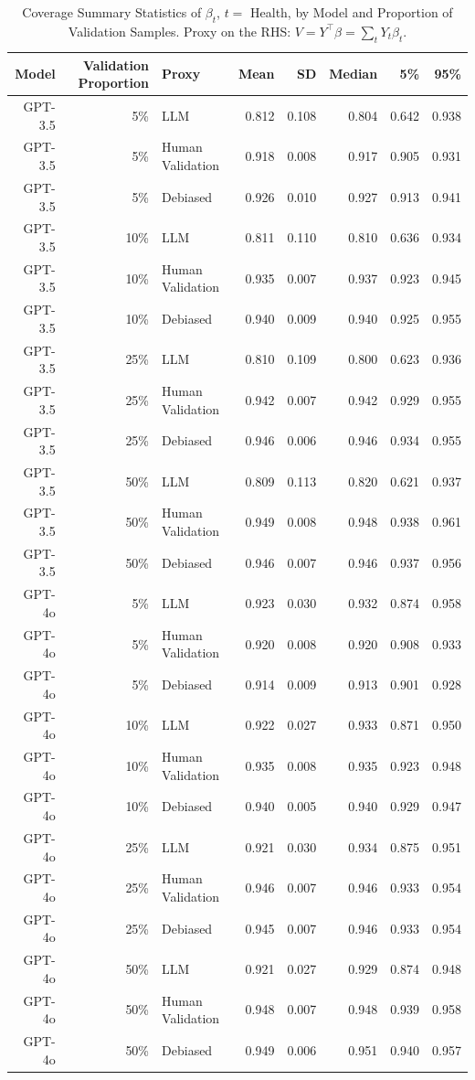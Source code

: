 \begin{table}

\caption{Coverage Summary Statistics of $\beta_{t}$, $t=$ Health, by Model and Proportion of Validation Samples.
      Proxy on the RHS: $V = Y^\top \beta = \sum_{t} Y_t \beta_t$.}
\centering
\begin{tabular}[t]{rrlrrrrr}
\toprule
Model & Validation Proportion & Proxy & Mean & SD & Median & 5\% & 95\%\\
\midrule
GPT-3.5 & 5\% & LLM & 0.812 & 0.108 & 0.804 & 0.642 & 0.938\\
GPT-3.5 & 5\% & Human Validation & 0.918 & 0.008 & 0.917 & 0.905 & 0.931\\
GPT-3.5 & 5\% & Debiased & 0.926 & 0.010 & 0.927 & 0.913 & 0.941\\
GPT-3.5 & 10\% & LLM & 0.811 & 0.110 & 0.810 & 0.636 & 0.934\\
GPT-3.5 & 10\% & Human Validation & 0.935 & 0.007 & 0.937 & 0.923 & 0.945\\
GPT-3.5 & 10\% & Debiased & 0.940 & 0.009 & 0.940 & 0.925 & 0.955\\
GPT-3.5 & 25\% & LLM & 0.810 & 0.109 & 0.800 & 0.623 & 0.936\\
GPT-3.5 & 25\% & Human Validation & 0.942 & 0.007 & 0.942 & 0.929 & 0.955\\
GPT-3.5 & 25\% & Debiased & 0.946 & 0.006 & 0.946 & 0.934 & 0.955\\
GPT-3.5 & 50\% & LLM & 0.809 & 0.113 & 0.820 & 0.621 & 0.937\\
GPT-3.5 & 50\% & Human Validation & 0.949 & 0.008 & 0.948 & 0.938 & 0.961\\
GPT-3.5 & 50\% & Debiased & 0.946 & 0.007 & 0.946 & 0.937 & 0.956\\
GPT-4o & 5\% & LLM & 0.923 & 0.030 & 0.932 & 0.874 & 0.958\\
GPT-4o & 5\% & Human Validation & 0.920 & 0.008 & 0.920 & 0.908 & 0.933\\
GPT-4o & 5\% & Debiased & 0.914 & 0.009 & 0.913 & 0.901 & 0.928\\
GPT-4o & 10\% & LLM & 0.922 & 0.027 & 0.933 & 0.871 & 0.950\\
GPT-4o & 10\% & Human Validation & 0.935 & 0.008 & 0.935 & 0.923 & 0.948\\
GPT-4o & 10\% & Debiased & 0.940 & 0.005 & 0.940 & 0.929 & 0.947\\
GPT-4o & 25\% & LLM & 0.921 & 0.030 & 0.934 & 0.875 & 0.951\\
GPT-4o & 25\% & Human Validation & 0.946 & 0.007 & 0.946 & 0.933 & 0.954\\
GPT-4o & 25\% & Debiased & 0.945 & 0.007 & 0.946 & 0.933 & 0.954\\
GPT-4o & 50\% & LLM & 0.921 & 0.027 & 0.929 & 0.874 & 0.948\\
GPT-4o & 50\% & Human Validation & 0.948 & 0.007 & 0.948 & 0.939 & 0.958\\
GPT-4o & 50\% & Debiased & 0.949 & 0.006 & 0.951 & 0.940 & 0.957\\
\bottomrule
\end{tabular}
\end{table}
